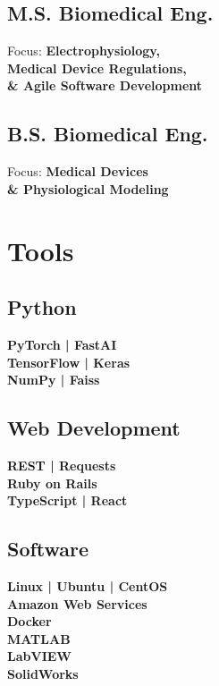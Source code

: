 \documentclass[letterpaper]{deedy-resume} %
\begin{document}
\begin{minipage}[t]{0.33\textwidth}
\subsection{M.S. Biomedical Eng.}
Focus: \bf Electrophysiology, \\ 
Medical Device Regulations, \\ 
\& Agile Software Development \\

\sectionspace %

\subsection{B.S. Biomedical Eng.}
Focus: \bf Medical Devices \\
\& Physiological Modeling \\

\sectionspace %


\section{Tools}

\subsection{Python}
{\bf PyTorch | FastAI} \\
{\bf TensorFlow | Keras} \\
{\bf NumPy | Faiss} \\

\sectionspace

\subsection{Web Development}
{\bf REST | Requests} \\
{\bf Ruby on Rails} \\
{\bf TypeScript | React} \\

\sectionspace %

\subsection{Software}
{\bf Linux | Ubuntu | CentOS} \\
{\bf Amazon Web Services} \\
{\bf Docker} \\
{\bf MATLAB} \\
{\bf LabVIEW} \\
{\bf SolidWorks} \\


\end{minipage}
\end{document}
